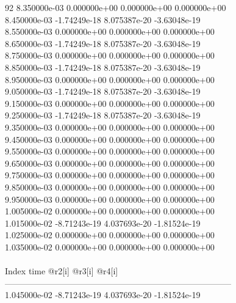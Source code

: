 92	8.350000e-03	0.000000e+00	0.000000e+00	0.000000e+00	\\ 	8.450000e-03	-1.74249e-18	8.075387e-20	-3.63048e-19	\\ 	8.550000e-03	0.000000e+00	0.000000e+00	0.000000e+00	\\ 	8.650000e-03	-1.74249e-18	8.075387e-20	-3.63048e-19	\\ 	8.750000e-03	0.000000e+00	0.000000e+00	0.000000e+00	\\ 	8.850000e-03	-1.74249e-18	8.075387e-20	-3.63048e-19	\\ 	8.950000e-03	0.000000e+00	0.000000e+00	0.000000e+00	\\ 	9.050000e-03	-1.74249e-18	8.075387e-20	-3.63048e-19	\\ 	9.150000e-03	0.000000e+00	0.000000e+00	0.000000e+00	\\ 	9.250000e-03	-1.74249e-18	8.075387e-20	-3.63048e-19	\\ 	9.350000e-03	0.000000e+00	0.000000e+00	0.000000e+00	\\ 	9.450000e-03	0.000000e+00	0.000000e+00	0.000000e+00	\\ 	9.550000e-03	0.000000e+00	0.000000e+00	0.000000e+00	\\ 	9.650000e-03	0.000000e+00	0.000000e+00	0.000000e+00	\\ 	9.750000e-03	0.000000e+00	0.000000e+00	0.000000e+00	\\ 	9.850000e-03	0.000000e+00	0.000000e+00	0.000000e+00	\\ 	9.950000e-03	0.000000e+00	0.000000e+00	0.000000e+00	\\ 	1.005000e-02	0.000000e+00	0.000000e+00	0.000000e+00	\\ 	1.015000e-02	-8.71243e-19	4.037693e-20	-1.81524e-19	\\ 	1.025000e-02	0.000000e+00	0.000000e+00	0.000000e+00	\\ 	1.035000e-02	0.000000e+00	0.000000e+00	0.000000e+00	\\ \hline
\\ \hline
Index   time            @r2[i]          @r3[i]          @r4[i]          \\ \hline
--------------------------------------------------------------------------------\\ 	1.045000e-02	-8.71243e-19	4.037693e-20	-1.81524e-19	\\ \hline
